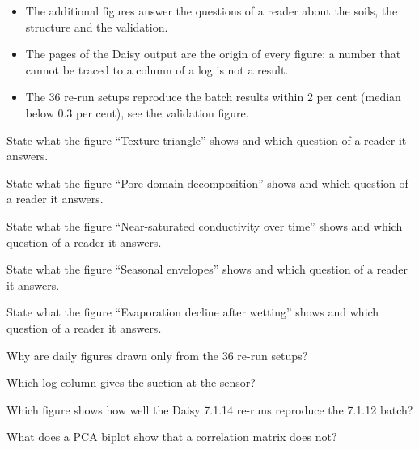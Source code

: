 \begin{itemize}\item The additional figures answer the questions of a reader about the soils, the structure and the validation.\item The pages of the Daisy output are the origin of every figure: a number that cannot be traced to a column of a log is not a result.\item The 36 re-run setups reproduce the batch results within 2 per cent (median below 0.3 per cent), see the validation figure.\end{itemize}
\begin{exlist}
\item State what the figure ``Texture triangle'' shows and which question of a reader it answers. 
\item State what the figure ``Pore-domain decomposition'' shows and which question of a reader it answers. 
\item State what the figure ``Near-saturated conductivity over time'' shows and which question of a reader it answers. 
\item State what the figure ``Seasonal envelopes'' shows and which question of a reader it answers. 
\item State what the figure ``Evaporation decline after wetting'' shows and which question of a reader it answers. 
\end{exlist}
\begin{exlist}\item Why are daily figures drawn only from the 36 re-run setups?\item Which log column gives the suction at the sensor?\item Which figure shows how well the Daisy 7.1.14 re-runs reproduce the 7.1.12 batch?\item What does a PCA biplot show that a correlation matrix does not?\end{exlist}
